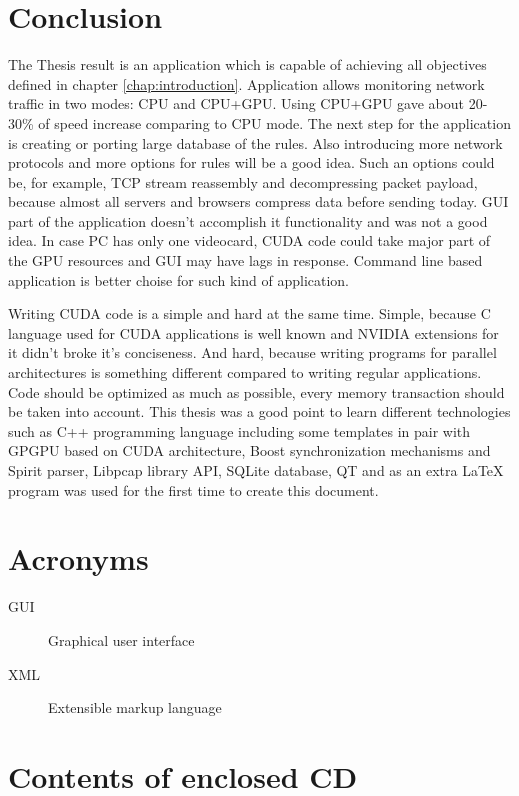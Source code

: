 \documentclass[thesis=M,english]{FITthesis}[2011/07/15]
\begin{document}
\chapter{Conclusion}
The Thesis result is an application which is capable of achieving all objectives defined in chapter \ref{chap:introduction}. Application allows monitoring network traffic in two modes: CPU and CPU+GPU. Using CPU+GPU gave about 20-30\% of speed increase comparing to CPU mode. The next step for the application is creating or porting large database of the rules. Also introducing more network protocols and more options for rules will be a good idea. Such an options could be, for example, TCP stream reassembly and decompressing packet payload, because almost all servers and browsers compress data before sending today. GUI part of the application doesn't accomplish it functionality and was not a good idea. In case PC has only one videocard, CUDA code could take major part of the GPU resources and GUI may have lags in response. Command line based application is better choise for such kind of application.

Writing CUDA code is a simple and hard at the same time. Simple, because C language used for CUDA applications is well known and NVIDIA extensions for it didn't broke it's conciseness. And hard, because writing programs for parallel architectures is something different compared to writing regular applications. Code should be optimized as much as possible, every memory transaction should be taken into account. This thesis was a good point to learn different technologies such as C++ programming language including some templates in pair with GPGPU based on CUDA architecture, Boost synchronization mechanisms and Spirit parser, Libpcap library API, SQLite database, QT and as an extra \LaTeX{} program was used for the first time to create this document.




\appendix

\chapter{Acronyms}
\begin{description}
	\item[GUI] Graphical user interface
	\item[XML] Extensible markup language
\end{description}


\chapter{Contents of enclosed CD}
\end{document}
